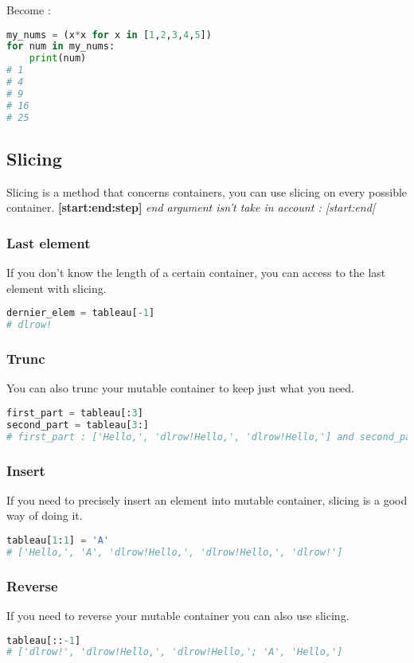 \documentclass[a4paper, 12pt, titlepage]{scrartcl} %
\begin{document}
Become : 
\begin{lstlisting}[language=Python]
my_nums = (x*x for x in [1,2,3,4,5])
for num in my_nums:
    print(num)
# 1
# 4
# 9
# 16
# 25
\end{lstlisting} \vspace{5mm}

\subsection{Slicing}
Slicing is a method that concerns containers, you can use slicing on every possible container. \textbf{[start:end:step]} \textit{end argument isn't take in account : [start:end[}

\subsubsection{Last element} 
If you don't know the length of a certain container, you can access to the last element with slicing.
\begin{lstlisting}[language=Python]
dernier_elem = tableau[-1]
# dlrow!
\end{lstlisting} \vspace{5mm}

\subsubsection{Trunc} 
You can also trunc your mutable container to keep just what you need.
\begin{lstlisting}[language=Python]
first_part = tableau[:3]
second_part = tableau[3:]
# first_part : ['Hello,', 'dlrow!Hello,', 'dlrow!Hello,'] and second_part : ['dlrow!']
\end{lstlisting} \vspace{5mm}

\subsubsection{Insert}  
If you need to precisely insert an element into mutable container, slicing is a good way of doing it.
\begin{lstlisting}[language=Python]
tableau[1:1] = 'A'
# ['Hello,', 'A', 'dlrow!Hello,', 'dlrow!Hello,', 'dlrow!']
\end{lstlisting} \vspace{5mm}

\subsubsection{Reverse} 
If you need to reverse your mutable container you can also use slicing.
\begin{lstlisting}[language=Python]
tableau[::-1]
# ['dlrow!', 'dlrow!Hello,', 'dlrow!Hello,'; 'A', 'Hello,']
\end{lstlisting} \vspace{5mm}
\end{document}
